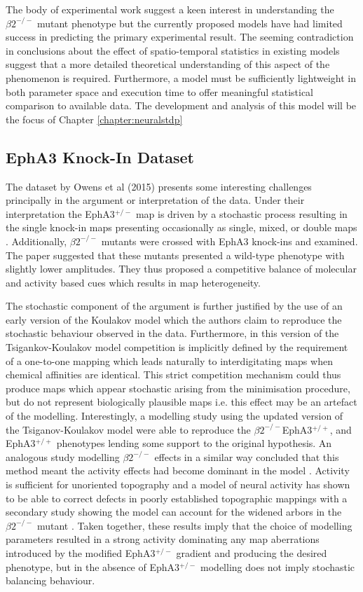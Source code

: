 The body of experimental work suggest a keen interest in understanding the $\beta2^{-/-}$ mutant phenotype but the currently proposed models have had limited success in predicting the primary experimental result. The seeming contradiction in conclusions about the effect of spatio-temporal statistics in existing models suggest that a more detailed theoretical understanding of this aspect of the phenomenon is required. Furthermore, a model must be sufficiently lightweight in both parameter space and execution time to offer meaningful statistical comparison to available data. The development and analysis of this model will be the focus of Chapter \ref{chapter:neuralstdp}
\subsection{EphA3 Knock-In Dataset }
The dataset by Owens et al (2015) presents some interesting challenges principally in the argument or interpretation of the data. Under their interpretation the EphA3$^{+/-}$ map is driven by a stochastic process resulting in the single knock-in maps presenting occasionally as single, mixed, or double maps \cite{Owens2015-zv}. Additionally, $\beta2^{-/-}$ mutants were crossed with EphA3 knock-ins and examined. The paper suggested that these mutants presented a wild-type phenotype with slightly lower amplitudes. They thus proposed a competitive balance of molecular and activity based cues which results in map heterogeneity. 

The stochastic component of the argument is further justified by the use of an early version of the Koulakov model which the authors claim to reproduce the stochastic behaviour observed in the data. Furthermore, in this version of the Tsigankov-Koulakov model competition is implicitly defined by the requirement of a one-to-one mapping which leads naturally to interdigitating maps when chemical affinities are identical. This strict competition mechanism could thus produce maps which appear stochastic arising from the minimisation procedure, but do not represent biologically plausible maps i.e. this effect may be an artefact of the modelling. Interestingly, a modelling study using the updated version of the Tsiganov-Koulakov model were able to reproduce the $\beta2^{-/-}$EphA3$^{+/+}$, and EphA3$^{+/+}$ phenotypes lending some support to the original hypothesis. An analogous study modelling $\beta2^{-/-}$ effects in a similar way concluded that this method meant the activity effects had become dominant in the model \cite{Lyngholm2019-fs}. Activity is sufficient for unoriented topography and a model of neural activity has shown to be able to correct defects in poorly established topographic mappings with a secondary study showing the model can account for the widened arbors in the $\beta2^{-/-}$ mutant \cite{Chandrasekaran2005-ug, McLaughlin2003-yy}. Taken together, these results imply that the choice of modelling parameters resulted in a strong activity dominating any map aberrations introduced by the modified EphA3$^{+/-}$ gradient and producing the desired phenotype, but in the absence of EphA3$^{+/-}$ modelling does not imply stochastic balancing behaviour.


